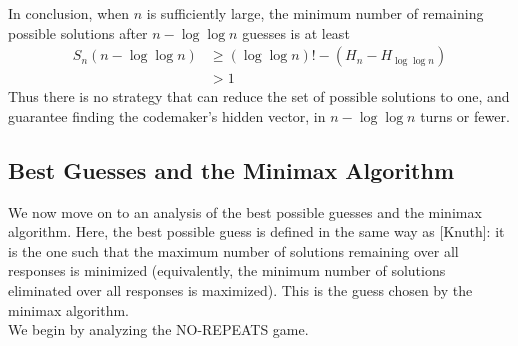 \documentclass[12pt, a4paper]{article}
\begin{document}
 	In conclusion, when $n$ is sufficiently large, the minimum number of remaining
	possible solutions after $n - \log\log n$ guesses is at least
		\begin{align*}
		S_n(n-\log\log n) & \ge (\log\log n)! - (H_n - H_{\log\log n})\\
		& > 1
		\end{align*}
	Thus there is no strategy that can reduce the set of possible solutions to
	one, and guarantee finding the codemaker's hidden vector, in $n-\log\log n$
	turns or fewer.
\subsection{Best Guesses and the Minimax Algorithm}
We now move on to an analysis of the best possible guesses and the minimax algorithm. Here, 
the best possible guess is defined in the same way as [Knuth]: it is the one such that the 
maximum number of solutions remaining over all responses is minimized (equivalently, the 
minimum number of solutions eliminated over all responses is maximized). This is the guess
chosen by the minimax algorithm. \\
We begin by analyzing the NO-REPEATS game.
\end{document}
